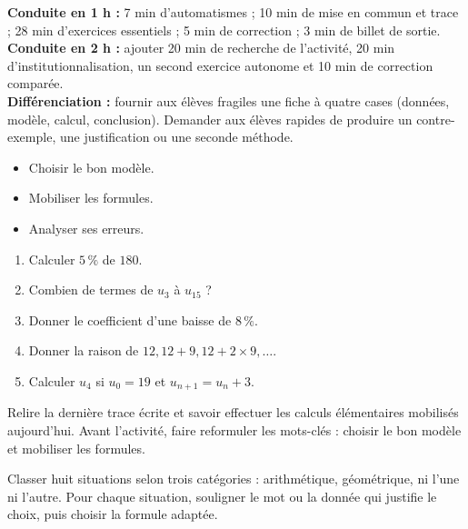 \ifprof
\begin{methode}
\textbf{Conduite en 1 h :} 7 min d'automatismes ; 10 min de mise en commun et trace ; 28 min d'exercices essentiels ; 5 min de correction ; 3 min de billet de sortie.\\
\textbf{Conduite en 2 h :} ajouter 20 min de recherche de l'activité, 20 min d'institutionnalisation, un second exercice autonome et 10 min de correction comparée.\\
\textbf{Différenciation :} fournir aux élèves fragiles une fiche à quatre cases (données, modèle, calcul, conclusion). Demander aux élèves rapides de produire un contre-exemple, une justification ou une seconde méthode.
\end{methode}
\fi
{}
\begin{objectifs}\begin{itemize}\item Choisir le bon modèle.\item Mobiliser les formules.\item Analyser ses erreurs.\end{itemize}\end{objectifs}
\begin{automatismes}\begin{enumerate}\item Calculer $5\,\%$ de $180$. \item Combien de termes de $u_3$ à $u_{15}$ ? \item Donner le coefficient d'une baisse de $8\,\%$. \item Donner la raison de $12,12+9,12+2\times9,\ldots$. \item Calculer $u_4$ si $u_0=19$ et $u_{n+1}=u_n+3$. \end{enumerate}\end{automatismes}
\begin{prerequis}Relire la dernière trace écrite et savoir effectuer les calculs élémentaires mobilisés aujourd'hui. Avant l'activité, faire reformuler les mots-clés : choisir le bon modèle et mobiliser les formules.\end{prerequis}

\begin{activite}
Classer huit situations selon trois catégories : arithmétique, géométrique, ni l'une ni l'autre. Pour chaque situation, souligner le mot ou la donnée qui justifie le choix, puis choisir la formule adaptée.

\end{activite}

